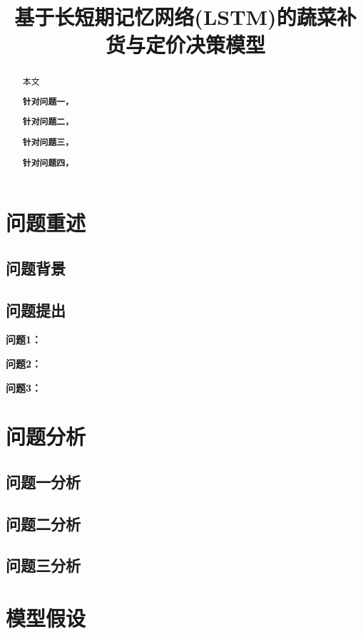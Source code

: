 \documentclass[withoutpreface,bwprint]{cumcmthesis} %
\title{基于长短期记忆网络(LSTM)的蔬菜补货与定价决策模型}
\begin{document}
\maketitle
\nocite{*}


\begin{abstract}
本文

    \textbf{针对问题一，}

    \textbf{针对问题二，}

    \textbf{针对问题三，}

    \textbf{针对问题四，}

\end{abstract}

\section{问题重述}

\subsection{问题背景}


\subsection{问题提出}


\textbf{问题1：}

\textbf{问题2：}

\textbf{问题3：}

\section{问题分析}

\subsection{问题一分析}

\subsection{问题二分析}

\subsection{问题三分析}

\section{模型假设}
\end{document}
